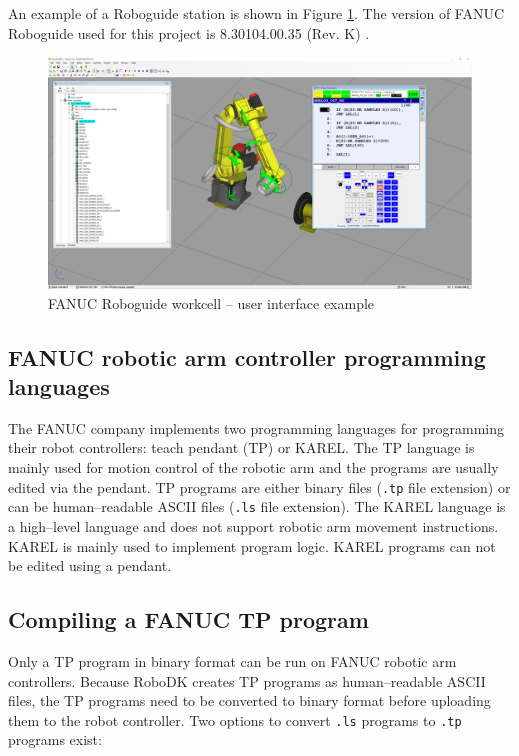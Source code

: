 An example of a Roboguide station is shown in Figure \ref{fig:roboguide}. The version of FANUC Roboguide used for this project is 8.30104.00.35 (Rev. K) \cite{roboguide}. 

\begin{figure}[h]
    \centering
    \includegraphics[width=0.9\linewidth]{img/roboguide.PNG}
    \caption{FANUC Roboguide workcell -- user interface example}
    \label{fig:roboguide}
\end{figure}

\subsection{FANUC robotic arm controller programming languages}

The FANUC company implements two programming languages for programming their robot controllers: teach pendant (TP) or KAREL. The TP language is mainly used for motion control of the robotic arm and the programs are usually edited via the pendant. TP programs are either binary files (\texttt{.tp} file extension) or can be human--readable ASCII files (\texttt{.ls} file extension). The KAREL language is a high--level language and does not support robotic arm movement instructions. KAREL is mainly used to implement program logic. KAREL programs can not be edited using a pendant.

\subsection{Compiling a FANUC TP program}

Only a TP program in binary format can be run on FANUC robotic arm controllers. Because RoboDK creates TP programs as human--readable ASCII files, the TP programs need to be converted to binary format before uploading them to the robot controller. Two options to convert \texttt{.ls} programs to \texttt{.tp} programs exist:

